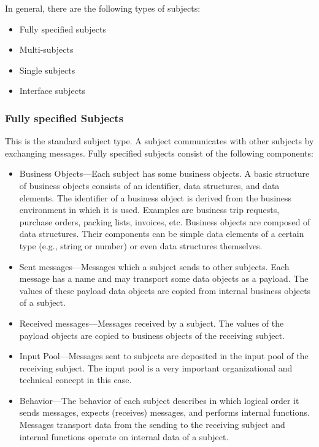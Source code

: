 In general, there are the following types of subjects:

\begin{itemize}
	\item Fully specified subjects
	\item Multi-subjects
	\item Single subjects
	\item Interface subjects 
\end{itemize}

\subsubsection{Fully specified Subjects}

This is the standard subject type. A subject communicates with other subjects by exchanging messages. Fully specified subjects consist of the following components:

\begin{itemize}
	\item Business Objects---Each subject has some business objects. A basic structure of business objects consists of an identifier, data structures, and data elements. The identifier of a business object is derived from the business environment in which it is used. Examples are business trip requests, purchase orders, packing lists, invoices, etc. Business objects are composed of data structures. Their components can be simple data elements of a certain type (e.g., string or number) or even data structures themselves. 
	\item Sent messages---Messages which a subject sends to other subjects. Each message has a name and may transport some data objects as a payload. The values of these payload data objects are copied from internal business objects of a subject.
	\item Received messages---Messages received by a subject. The values of the payload objects are copied to business objects of the receiving subject.
	\item Input Pool---Messages sent to subjects are deposited in the input pool of the receiving subject. The input pool is a very important organizational and technical concept in this case.
	\item Behavior---The behavior of each subject describes in which logical order it sends messages, expects (receives) messages, and performs internal functions. Messages transport data from the sending to the receiving subject and internal functions operate on internal data of a subject. 
\end{itemize}


